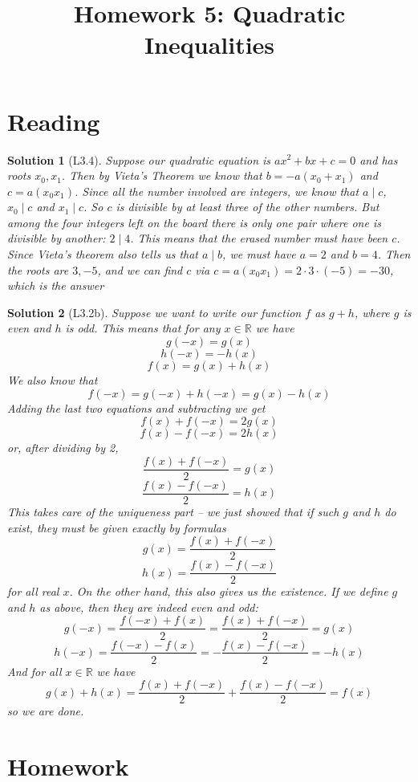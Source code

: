 \documentclass[a4paper,12pt]{article}
\title{Homework 5: Quadratic Inequalities}
\theoremstyle{perfect}
\newtheorem{sol}{Solution}
\newcommand{\R}{\mathbb{R}}
\begin{document}
 
\maketitle

\section{Reading}

\begin{sol}[L3.4]
Suppose our quadratic equation is $ax^2+bx+c = 0$ and has roots $x_0, x_1$. Then by Vieta's Theorem we know that $b = -a(x_0+x_1)$ and $c = a(x_0x_1)$. Since all the number involved are integers, we know that $a \mid c$, $x_0 \mid c$ and $x_1 \mid c$. So $c$ is divisible by at least three of the other numbers. But among the four integers left on the board there is only one pair where one is divisible by another: $2 \mid 4$. This means that the erased number must have been $c$. Since Vieta's theorem also tells us that $a \mid b$, we must have $a = 2$ and $b = 4$. Then the roots are $3, -5$, and we can find $c$ via $c = a(x_0x_1) = 2 \cdot 3 \cdot (-5) = -30$, which is the answer
\end{sol}

\begin{sol}[L3.2b]
Suppose we want to write our function $f$ as $g+h$, where $g$ is even and $h$ is odd. This means that for any $x 
\in \R$ we have $$g(-x) = g(x)$$ $$h(-x) = -h(x)$$ $$f(x) = g(x)+h(x)$$ We also know that $$f(-x) = g(-x) + h(-x) = g(x) - h(x)$$ Adding the last two equations and subtracting we get $$f(x) + f(-x) = 2g(x)$$ $$f(x) - f(-x) = 2h(x)$$ or, after dividing by 2, $$\frac{f(x) + f(-x)}{2} = g(x)$$ $$\frac{f(x) - f(-x)}{2} = h(x)$$ This takes care of the uniqueness part -- we just showed that if such $g$ and $h$ do exist, they must be given exactly by formulas $$g(x) = \frac{f(x) + f(-x)}{2}$$ $$h(x) = \frac{f(x) - f(-x)}{2}$$ for all real $x$. On the other hand, this also gives us the existence. If we define $g$ and $h$ as above, then they are indeed even and odd: $$g(-x) = \frac{f(-x) + f(x)}{2} = \frac{f(x) + f(-x)}{2} = g(x)$$ $$h(-x) = \frac{f(-x) - f(x)}{2} = -\frac{f(x) - f(-x)}{2} = -h(x)$$ And for all $x \in \R$ we have $$g(x) + h(x) = \frac{f(x) + f(-x)}{2} + \frac{f(x) - f(-x)}{2} = f(x)$$ so we are done.
 \end{sol}

\section{Homework}
\end{document}
